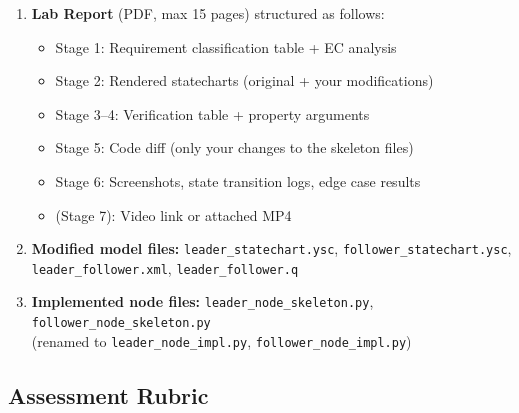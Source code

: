 \documentclass[11pt, a4paper]{article}
\begin{document}
\begin{enumerate}
  \item \textbf{Lab Report} (PDF, max 15 pages) structured as follows:
        \begin{itemize}
          \item Stage 1: Requirement classification table + EC analysis
          \item Stage 2: Rendered statecharts (original + your modifications)
          \item Stage 3–4: Verification table + property arguments
          \item Stage 5: Code diff (only your changes to the skeleton files)
          \item Stage 6: Screenshots, state transition logs, edge case results
          \item (Stage 7): Video link or attached MP4
        \end{itemize}
  \item \textbf{Modified model files:}
        \texttt{leader\_statechart.ysc},
        \texttt{follower\_statechart.ysc},\\
        \texttt{leader\_follower.xml},
        \texttt{leader\_follower.q}
  \item \textbf{Implemented node files:}
        \texttt{leader\_node\_skeleton.py},
        \texttt{follower\_node\_skeleton.py}\\
        (renamed to \texttt{leader\_node\_impl.py}, \texttt{follower\_node\_impl.py})
\end{enumerate}

\subsection{Assessment Rubric}
\end{document}
